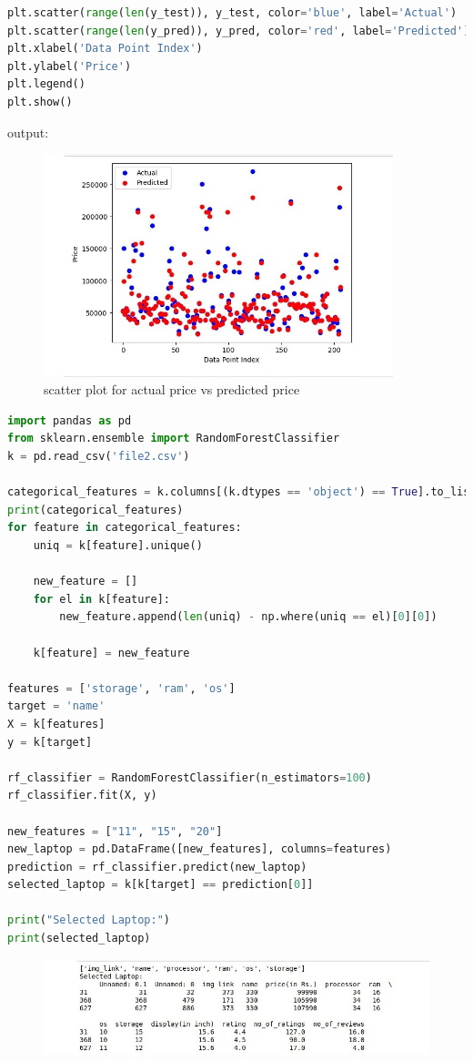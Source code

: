  \begin{lstlisting}[language=Python]
plt.scatter(range(len(y_test)), y_test, color='blue', label='Actual')
plt.scatter(range(len(y_pred)), y_pred, color='red', label='Predicted')
plt.xlabel('Data Point Index')
plt.ylabel('Price')
plt.legend()
plt.show()
 \end{lstlisting} 
 output: 
 \begin{figure}[h]
\centering
\footnotesize
\includegraphics[width=4in]{34.jpeg}
\caption{scatter plot for  actual price vs predicted price }
\label{fig:unevenlight}
\end{figure}
\begin{lstlisting}[language=Python]
import pandas as pd
from sklearn.ensemble import RandomForestClassifier
k = pd.read_csv('file2.csv') 

categorical_features = k.columns[(k.dtypes == 'object') == True].to_list()
print(categorical_features)
for feature in categorical_features:
    uniq = k[feature].unique()

    new_feature = []
    for el in k[feature]:
        new_feature.append(len(uniq) - np.where(uniq == el)[0][0])

    k[feature] = new_feature

features = ['storage', 'ram', 'os'] 
target = 'name' 
X = k[features]
y = k[target]

rf_classifier = RandomForestClassifier(n_estimators=100)
rf_classifier.fit(X, y)

new_features = ["11", "15", "20"]
new_laptop = pd.DataFrame([new_features], columns=features)
prediction = rf_classifier.predict(new_laptop)
selected_laptop = k[k[target] == prediction[0]]

print("Selected Laptop:")
print(selected_laptop)
\end{lstlisting}
\begin{figure}[h]
\centering
\footnotesize
\includegraphics[width=5in]{54.jpeg}
\label{fig:unevenlight}
\end{figure}
